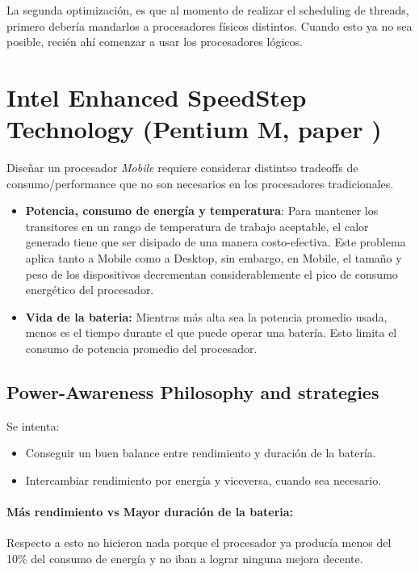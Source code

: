La segunda optimización, es que al momento de realizar el scheduling de threads, primero debería mandarlos a procesadores físicos distintos. Cuando esto ya no sea posible, recién ahí comenzar a usar los procesadores lógicos.

\newpage
\section{Intel Enhanced SpeedStep Technology (Pentium M, paper \cite{Gochman2003TheIP})}

Diseñar un procesador \textit{Mobile} requiere considerar distintso tradeoffs de consumo/performance que no son necesarios en los procesadores tradicionales.

\begin{itemize}
	\item \textbf{Potencia, consumo de energía y temperatura}: Para mantener los transitores en un rango de temperatura de trabajo aceptable, el calor generado tiene que ser disipado de una manera costo-efectiva. Este problema aplica tanto a Mobile como a Desktop, sin embargo, en Mobile, el tamaño y peso de los dispositivos decrementan considerablemente el pico de consumo energético del procesador.

	\item \textbf{Vida de la bateria:} Mientras más alta sea la potencia promedio usada, menos es el tiempo durante el que puede operar una batería. Esto limita el consumo de potencia promedio del procesador.
\end{itemize}

\subsection{Power-Awareness Philosophy and strategies}
Se intenta: 
\begin{itemize}
	\item Conseguir un buen balance entre rendimiento y duración de la batería.
	\item Intercambiar rendimiento por energía y viceversa, cuando sea necesario.
\end{itemize}

\paragraph{Más rendimiento vs Mayor duración de la bateria:} Respecto a esto no hicieron nada porque el procesador ya producía menos del 10\% del consumo de energía y no iban a lograr ninguna mejora decente.

